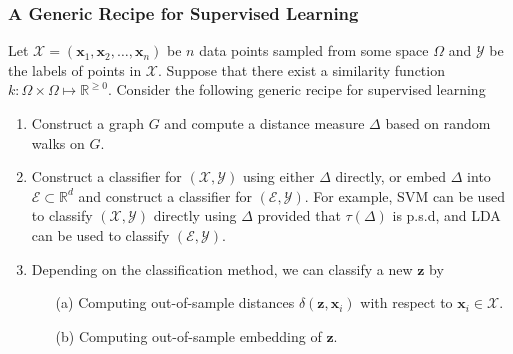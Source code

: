 \documentclass[professionalfonts, hyperref={pdfpagelabels=false,
  colorlinks=true, linkcolor=purple}]{beamer}
\begin{document}
\begin{frame}
  \frametitle{A Generic Recipe for Supervised Learning}
  Let $\mathcal{X} = (\mathbf{x}_1, \mathbf{x}_2, \dots,
  \mathbf{x}_n)$ be $n$ data points sampled from some space
  $\Omega$ and $\mathcal{Y}$ be the
  labels of points in $\mathcal{X}$. Suppose that there exist a
  similarity function $k \colon \Omega \times \Omega \mapsto
  \mathbb{R}^{\geq 0}$. Consider the following generic recipe for
  supervised learning
  \begin{enumerate}
  \item Construct a graph $G$ and compute a distance measure $\Delta$
    based on random walks on $G$. 
  \item Construct a classifier for $(\mathcal{X}, \mathcal{Y})$ using
    either $\Delta$ directly, or embed $\Delta$ into
    $\mathcal{E} \subset \mathbb{R}^{d}$ and construct a classifier
    for $(\mathcal{E}, \mathcal{Y})$. For example, SVM can be used to
    classify $(\mathcal{X}, \mathcal{Y})$ directly using $\Delta$
    provided that $\tau(\Delta)$ is p.s.d, and LDA can
    be used to classify $(\mathcal{E}, \mathcal{Y})$. 
  \item Depending on the classification method, we can classify a new
    $\mathbf{z}$ by
    \begin{enumerate}
    \item[(a)] Computing out-of-sample distances 
      $\delta(\mathbf{z},\mathbf{x}_i)$ with respect to $\mathbf{x}_i \in
      \mathcal{X}$.
    \item[(b)] Computing out-of-sample embedding \cite{trosset08,bengio04:_out_lle_isomap_mds_eigen} of $\mathbf{z}$.
    \end{enumerate}
  \end{enumerate}
\end{frame}
\begin{frame}

\end{frame}
\end{document}

